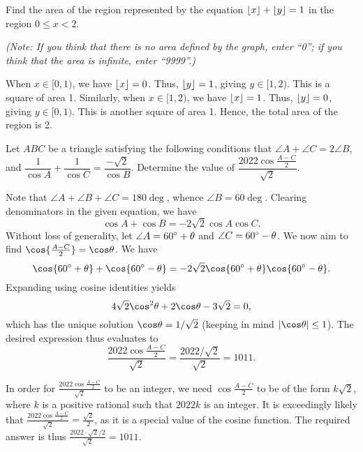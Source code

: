 \begin{question}[2]\label{A::2023-O-1-10}
    Find the area of the region represented by the equation $\left\lfloor x \right\rfloor + \left\lfloor y \right\rfloor = 1$ in the region $0 \leq x < 2$.

    \noindent\textit{(Note: If you think that there is no area defined by the graph, enter ``0''; if you think that the area is infinite, enter ``9999''.)}
\end{question}
\begin{solution*}
    When $x \in [0, 1)$, we have $\left\lfloor x \right\rfloor = 0$. Thus, $\left\lfloor y \right\rfloor = 1$, giving $y \in [1, 2)$. This is a square of area 1. Similarly, when $x \in [1, 2)$, we have $\left\lfloor x \right\rfloor = 1$. Thus, $\left\lfloor y \right\rfloor = 0$, giving $y \in [0, 1)$. This is another square of area 1. Hence, the total area of the region is 2.
\end{solution*}

\begin{question}[1011]\label{A::2023-O-1-11}
    Let $ABC$ be a triangle satisfying the following conditions that $\angle A + \angle C = 2\angle B$, and $\dfrac1{\cos A} + \dfrac1{\cos C} = \dfrac{-\sqrt2}{\cos B}$. Determine the value of $\dfrac{2022\cos{\frac{A-C}{2}}}{\sqrt2}$.
\end{question}
\begin{solution}
    Note that $\angle A + \angle B + \angle C = 180 \deg$, whence $\angle B = 60 \deg$. Clearing denominators in the given equation, we have \[\cos A + \cos B = -2\sqrt{2}\cos A \cos C. \] Without loss of generality, let $\angle A = 60^{\circ} + \theta$ and $\angle C = 60 ^{\circ} - \theta$. We now aim to find $\cos{\frac{A-C}{2}} = \cos\t$. We have \[\cos{60\deg + \t} + \cos{60\deg - \t} = -2\sqrt2 \cos{60\deg + \t}\cos{60 \deg - \t}.\] Expanding using cosine identities yields \[4\sqrt2 \cos^2 \t + 2\cos \t - 3\sqrt2 = 0,\] which has the unique solution $\cos \t = 1/\sqrt2$ (keeping in mind $\abs{\cos \t} \leq 1$). The desired expression thus evaluates to \[\frac{2022\cos{\tfrac{A-C}{2}}}{\sqrt2} = \frac{2022/\sqrt{2}}{\sqrt2} = 1011.\]
\end{solution}
\begin{solution}
    In order for $\frac{2022\cos{\frac{A-C}{2}}}{\sqrt2}$ to be an integer, we need $\cos{\frac{A-C}{2}}$ to be of the form $k\sqrt{2}$, where $k$ is a positive rational such that $2022k$ is an integer. It is exceedingly likely that $\frac{2022\cos{\frac{A-C}{2}}}{\sqrt2} = \frac{\sqrt2}{2}$, as it is a special value of the cosine function. The required answer is thus $\frac{2022\cdot\sqrt{2}/2}{\sqrt2} = 1011$.
\end{solution}

